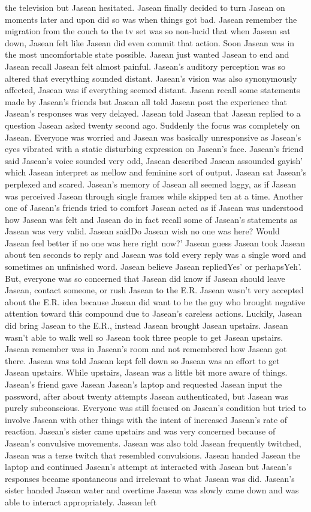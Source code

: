 \documentclass[12pt]{book}
\begin{document}
the television but Jasean hesitated. Jasean finally decided to turn Jasean on moments later and upon did so was when things got bad. Jasean remember the migration from the couch to the tv set was so non-lucid that when Jasean sat down, Jasean felt like Jasean did even commit that action. Soon Jasean was in the most uncomfortable state possible. Jasean just wanted Jasean to end and Jasean recall Jasean felt almost painful. Jasean's auditory perception was so altered that everything sounded distant. Jasean's vision was also synonymously affected, Jasean was if everything seemed distant. Jasean recall some statements made by Jasean's friends but Jasean all told Jasean post the experience that Jasean's responses was very delayed. Jasean told Jasean that Jasean replied to a question Jasean asked twenty second ago. Suddenly the focus was completely on Jasean. Everyone was worried and Jasean was basically unresponsive as Jasean's eyes vibrated with a static disturbing expression on Jasean's face. Jasean's friend said Jasean's voice sounded very odd, Jasean described Jasean assounded gayish' which Jasean interpret as mellow and feminine sort of output. Jasean sat Jasean's perplexed and scared. Jasean's memory of Jasean all seemed laggy, as if Jasean was perceived Jasean through single frames while skipped ten at a time. Another one of Jasean's friends tried to comfort Jasean acted as if Jasean was understood how Jasean was felt and Jasean do in fact recall some of Jasean's statements as Jasean was very valid. Jasean saidDo Jasean wish no one was here? Would Jasean feel better if no one was here right now?' Jasean guess Jasean took Jasean about ten seconds to reply and Jasean was told every reply was a single word and sometimes an unfinished word. Jasean believe Jasean repliedYes' or perhapsYeh'. But, everyone was so concerned that Jasean did know if Jasean should leave Jasean, contact someone, or rush Jasean to the E.R. Jasean wasn't very accepted about the E.R. idea because Jasean did want to be the guy who brought negative attention toward this compound due to Jasean's careless actions. Luckily, Jasean did bring Jasean to the E.R., instead Jasean brought Jasean upstairs. Jasean wasn't able to walk well so Jasean took three people to get Jasean upstairs. Jasean remember was in Jasean's room and not remembered how Jasean got there. Jasean was told Jasean kept fell down so Jasean was an effort to get Jasean upstairs. While upstairs, Jasean was a little bit more aware of things. Jasean's friend gave Jasean Jasean's laptop and requested Jasean input the password, after about twenty attempts Jasean authenticated, but Jasean was purely subconscious. Everyone was still focused on Jasean's condition but tried to involve Jasean with other things with the intent of increased Jasean's rate of reaction. Jasean's sister came upstairs and was very concerned because of Jasean's convulsive movements. Jasean was also told Jasean frequently twitched, Jasean was a terse twitch that resembled convulsions. Jasean handed Jasean the laptop and continued Jasean's attempt at interacted with Jasean but Jasean's responses became spontaneous and irrelevant to what Jasean was did. Jasean's sister handed Jasean water and overtime Jasean was slowly came down and was able to interact appropriately. Jasean left 
\end{document}
